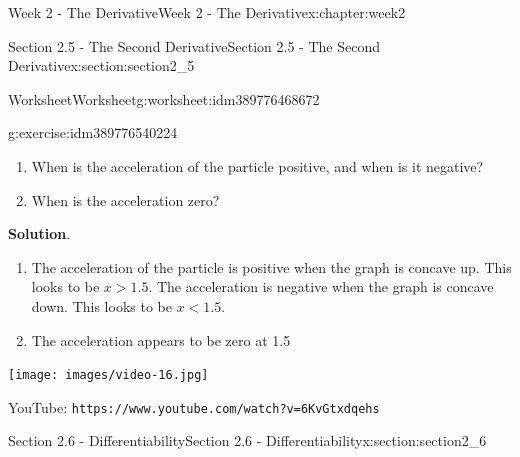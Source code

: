 \documentclass[oneside,10pt,]{book}
\newcommand{\blocktitlefont}{\relax}
\newcommand{\mono}[1]{\texttt{#1}}
\numberwithin{equation}{section}
\newlength{\qrsize}
\newlength{\previewwidth}
\begin{document}
\begin{chapterptx}{Week 2 - The Derivative}{}{Week 2 - The Derivative}{}{}{x:chapter:week2}
\begin{sectionptx}{Section 2.5 - The Second Derivative}{}{Section 2.5 - The Second Derivative}{}{}{x:section:section2_5}
\begin{worksheet-subsection}{Worksheet}{}{Worksheet}{}{}{g:worksheet:idm389776468672}
\begin{divisionexercise}{3}{}{}{g:exercise:idm389776540224}
\begin{image}{0}{1}{0}
\end{image}%
%
%
\begin{enumerate}[label=(\alph*)]
\item{}When is the acceleration of the particle positive, and when is it negative?%
\item{}When is the acceleration zero?%
\end{enumerate}
\textbf{\blocktitlefont Solution}.\hypertarget{g:solution:idm389776550656}{}\quad{}%
\begin{enumerate}[label=(\alph*)]
\item{}The acceleration of the particle is positive when the graph is concave up. This looks to be \(x>1.5\). The acceleration is negative when the graph is concave down. This looks to be \(x< 1.5\).%
\item{}The acceleration appears to be zero at 1.5%
\end{enumerate}
\end{divisionexercise}%
%
\end{worksheet-subsection}
\restoregeometry
\setlength{\qrsize}{9em}
\setlength{\previewwidth}{\linewidth}
\addtolength{\previewwidth}{-\qrsize}
\begin{tcbraster}[raster columns=2, raster column skip=1pt, raster halign=center, raster force size=false, raster left skip=0pt, raster right skip=0pt]%
\begin{tcolorbox}[previewstyle, width=\previewwidth]%
\texttt{[image: images/video-16.jpg]}%
\end{tcolorbox}%
\begin{tcolorbox}[qrstyle]%
{\hypersetup{urlcolor=black}}%
\end{tcolorbox}%
\begin{tcolorbox}[captionstyle]%
\small YouTube: \mono{https://www.youtube.com/watch?v=6KvGtxdqehs}\end{tcolorbox}%
\end{tcbraster}%
\end{sectionptx}
%
%
\typeout{************************************************}
\typeout{************************************************}
%
\begin{sectionptx}{Section 2.6 - Differentiability}{}{Section 2.6 - Differentiability}{}{}{x:section:section2_6}
\setlength{\qrsize}{9em}
\setlength{\previewwidth}{\linewidth}
\addtolength{\previewwidth}{-\qrsize}

\end{sectionptx}
\end{chapterptx}
\end{document}
